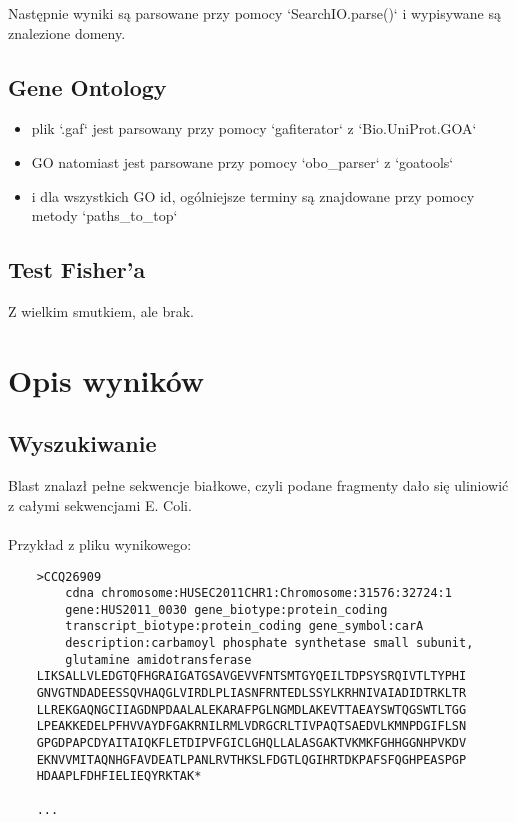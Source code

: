 \documentclass{article}
\begin{document}
            Następnie wyniki są parsowane przy pomocy `SearchIO.parse()` i wypisywane są znalezione domeny.


        \subsection{Gene Ontology}

            \begin{itemize}
                \item
                    plik `.gaf` jest parsowany przy pomocy `gafiterator` z `Bio.UniProt.GOA`

                \item
                    GO natomiast jest parsowane przy pomocy `obo\_parser` z `goatools`

                \item
                    i dla wszystkich GO id, ogólniejsze terminy są znajdowane przy pomocy metody `paths\_to\_top`

            \end{itemize}


        \subsection{Test Fisher'a}

            Z wielkim smutkiem, ale brak.


    \section{Opis wyników}

        \subsection{Wyszukiwanie}

            Blast znalazł pełne sekwencje białkowe, czyli podane fragmenty dało się uliniowić z całymi sekwencjami E. Coli.
            \\ \\
            Przykład z pliku wynikowego:
    \begin{verbatim}
    >CCQ26909
        cdna chromosome:HUSEC2011CHR1:Chromosome:31576:32724:1
        gene:HUS2011_0030 gene_biotype:protein_coding
        transcript_biotype:protein_coding gene_symbol:carA
        description:carbamoyl phosphate synthetase small subunit,
        glutamine amidotransferase
    LIKSALLVLEDGTQFHGRAIGATGSAVGEVVFNTSMTGYQEILTDPSYSRQIVTLTYPHI
    GNVGTNDADEESSQVHAQGLVIRDLPLIASNFRNTEDLSSYLKRHNIVAIADIDTRKLTR
    LLREKGAQNGCIIAGDNPDAALALEKARAFPGLNGMDLAKEVTTAEAYSWTQGSWTLTGG
    LPEAKKEDELPFHVVAYDFGAKRNILRMLVDRGCRLTIVPAQTSAEDVLKMNPDGIFLSN
    GPGDPAPCDYAITAIQKFLETDIPVFGICLGHQLLALASGAKTVKMKFGHHGGNHPVKDV
    EKNVVMITAQNHGFAVDEATLPANLRVTHKSLFDGTLQGIHRTDKPAFSFQGHPEASPGP
    HDAAPLFDHFIELIEQYRKTAK*

    ...
    \end{verbatim}
\end{document}
